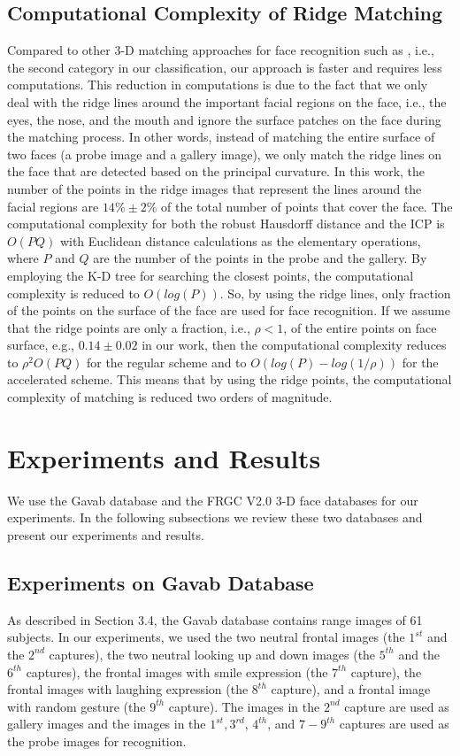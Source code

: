 \subsection{Computational Complexity of Ridge Matching}
Compared to other 3-D matching approaches for face recognition such
as \cite{lu06,russ05,chang05}, i.e., the second category in our
classification, our approach is faster and requires less
computations. This reduction in computations is due to the fact that
we only deal with the ridge lines around the important facial
regions on the face, i.e., the eyes, the nose, and the mouth and
ignore the surface patches on the face during the matching process.
In other words, instead of matching the entire surface of two faces
(a probe image and a gallery image), we only match the ridge lines
on the face that are detected based on the principal curvature. In
this work, the number of the points in the ridge images that
represent the lines around the facial regions are $14\% \pm 2\%$ of
the total number of points that cover the face. The computational
complexity for both the robust Hausdorff distance and the ICP is
$O(PQ)$ with Euclidean distance calculations as the elementary
operations, where $P$ and $Q$ are the number of the points in the
probe and the gallery. By employing the K-D tree for searching the
closest points, the computational complexity is reduced to
$O(log(P))$. So, by using the ridge lines, only fraction of the
points on the surface of the face are used for face recognition. If
we assume that the ridge points are only a fraction, i.e., $\rho <
1$, of the entire points on face surface, e.g., $0.14 \pm 0.02$ in
our work, then the computational complexity reduces to
$\rho^{2}O(PQ)$ for the regular scheme and to $O(log(P) -
log(1/\rho))$ for the accelerated scheme. This means that by using
the ridge points, the computational complexity of matching is
reduced two orders of magnitude.

\section{Experiments and Results} \label{experiments} We use the
Gavab database \cite{moreno04} and the FRGC V2.0 \cite{FRGC2005} 3-D
face databases for our experiments. In the following subsections we
review these two databases and present our experiments and results.

\subsection{Experiments on Gavab Database} As described in Section
3.4, the Gavab database contains range images of 61 subjects. In our
experiments, we used the two neutral frontal images (the $1^{st}$
and the $2^{nd}$ captures), the two neutral looking up and down
images (the $5^{th}$ and the $6^{th}$ captures), the frontal images
with smile expression (the $7^{th}$ capture), the frontal images
with laughing expression (the $8^{th}$ capture), and a frontal image
with random gesture (the $9^{th}$ capture). The images in the
$2^{nd}$ capture are used as gallery images and the images in the
$1^{st}, 3^{rd}$, $4^{th}$, and $7-9^{th}$ captures are used as the
probe images for recognition.

